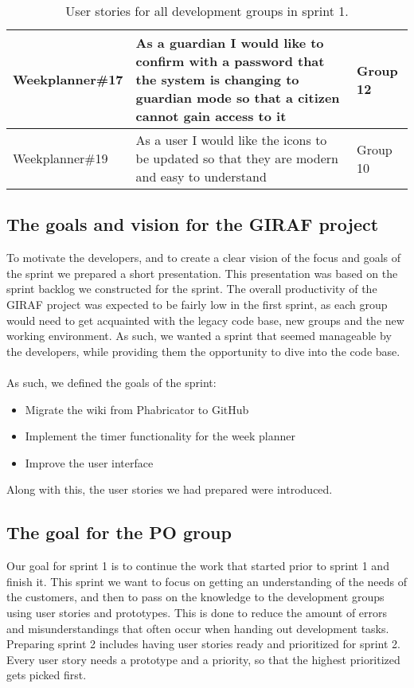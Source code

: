 \begin{table}[H]
\begin{tabular}{|p{2.8cm}|p{8cm}|p{2cm}|}
    Weekplanner\#17 & As a guardian I would like to confirm with a password that the system is changing to guardian mode so that a citizen cannot gain access to it                            & Group 12             \\ \hline
    Weekplanner\#19 & As a user I would like the icons to be updated so that they are modern and easy to understand                                                                            & Group 10             \\ \hline
    \end{tabular}
    \caption{User stories for all development groups in sprint 1.}\label{table:user-stories-sprint-1}
\end{table}


\subsection{The goals and vision for the GIRAF project}
To motivate the developers, and to create a clear vision of the focus and goals of the sprint we prepared a short presentation.
This presentation was based on the sprint backlog we constructed for the sprint.
The overall productivity of the GIRAF project was expected to be fairly low in the first sprint, as each group would need to get acquainted with the legacy code base, new groups and the new working environment.
As such, we wanted a sprint that seemed manageable by the developers, while providing them the opportunity to dive into the code base.
\\\\
As such, we defined the goals of the sprint:
\begin{itemize}
    \item Migrate the wiki from Phabricator to GitHub
    \item Implement the timer functionality for the week planner
    \item Improve the user interface
\end{itemize}
Along with this, the user stories we had prepared were introduced.

\subsection{The goal for the PO group}
Our goal for sprint 1 is to continue the work that started prior to sprint 1 and finish it.
This sprint we want to focus on getting an understanding of the needs of the customers, and then to pass on the knowledge to the development groups using user stories and prototypes.
This is done to reduce the amount of errors and misunderstandings that often occur when handing out development tasks.
Preparing sprint 2 includes having user stories ready and prioritized for sprint 2.
Every user story needs a prototype and a priority, so that the highest prioritized gets picked first.

